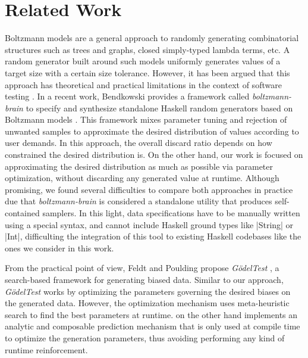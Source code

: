 \section{Related Work}


%
%
Boltzmann models \cite{Duchon2004} are a general approach to randomly generating
combinatorial structures such as trees and graphs, closed simply-typed lambda
terms, etc.
%
A random generator built around such models uniformly generates values of a
target size with a certain size tolerance.
%
However, it has been argued that this approach has theoretical and practical
limitations in the context of software testing \cite{feldt2013}.
%
In a recent work, Bendkowski provides a framework called \emph{boltzmann-brain}
to specify and synthesize standalone Haskell random generators based on
Boltzmann models \cite{bendkowski2018}.
%
This framework mixes parameter tuning and rejection of unwanted samples to
approximate the desired distribution of values according to user demands.
%
In this approach, the overall discard ratio depends on how constrained the
desired distribution is.
%
On the other hand, our work is focused on approximating the desired distribution
as much as possible via parameter optimization, without discarding any generated
value at runtime.
%
Although promising, we found several difficulties to compare both approaches in
practice due that \emph{boltzmann-brain} is considered a standalone utility that
produces self-contained samplers.
%
In this light, data specifications have to be manually written using a special
syntax, and cannot include Haskell ground types like |String| or |Int|,
difficulting the integration of this tool to existing Haskell codebases like the
ones we consider in this work.



%
%
From the practical point of view, Feldt and Poulding propose \emph{G\"odelTest}
\cite{feldt2013}, a search-based framework for generating biased data.
%
%
Similar to our approach, \emph{G\"odelTest} works by optimizing the parameters
governing the desired biases on the generated data.
%
However, the optimization mechanism uses meta-heuristic search to find the best
parameters at runtime.
%
\dragenp on the other hand implements an analytic and composable prediction
mechanism that is only used at compile time to optimize the generation
parameters, thus avoiding performing any kind of runtime reinforcement.


